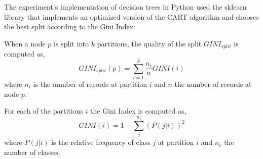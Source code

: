 	The experiment's implementation of decision trees in Python used the sklearn library that implements an optimized version of the CART algorithm and chooses the best split according to the Gini Index:
	
	When a node $p$ is split into $k$ partitions, the quality of the split $GINI_{split}$ is computed as,
	\begin{equation}
	    GINI_{split}(p) = \sum_{i = 1}^{k} \frac{n_i}{n} GINI(i)
	\end{equation}
	 where $n_i$ is the number of records at partition $i$ and $n$ the number of records at node $p$. 
	 
	 For each of the partitions $i$ the Gini Index is computed as,
	 \begin{equation}
	     GINI(i) = 1 - \sum_{j}^{n_c}(P(j|i))^2
	 \end{equation}
	 where $P(j|i)$ is the relative frequency of class $j$ at partition $i$ and $n_c$ the number of classes. 
	
	
	

	
